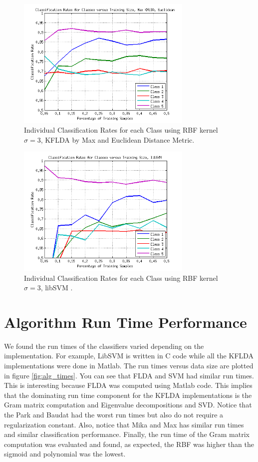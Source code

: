 \documentclass[journal]{IEEEtran}
\begin{document}
\begin{figure}[!h]
\centering
\includegraphics[width=3.3in]{../images/individual_class_euclid.png}
\caption{Individual Classification Rates for each Class using RBF kernel \(\sigma=3\), KFLDA by Max \cite{max} and Euclidean Distance Metric.}
\label{fig:indiv_eu}
\end{figure}

\begin{figure}[!h]
\centering
\includegraphics[width=3.3in]{../images/individual_class_svm.png}
\caption{Individual Classification Rates for each Class using RBF kernel \(\sigma=3\), libSVM \cite{libsvm}.}
\label{fig:indiv_svm}
\end{figure}

\section{Algorithm Run Time Performance}
\par We found the run times of the classifiers varied depending on the implementation. For example, LibSVM is written in C code while all the KFLDA implementations were done in Matlab. The run times versus data size are plotted in figure \ref{fig:alg_times}. You can see that FLDA and SVM had similar run times. This is interesting because FLDA was computed using Matlab code. This implies that the dominating run time component for the KFLDA implementations is the Gram matrix computation and Eigenvalue decompositions and SVD. Notice that the Park and Baudat had the worst run times but also do not require a regularization constant. Also, notice that Mika and Max has similar run times and similar classification performance. Finally, the run time of the Gram matrix computation was evaluated and found, as expected, the RBF was higher than the sigmoid and polynomial was the lowest.
\end{document}
